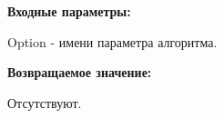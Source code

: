 \textbf{Входные параметры:}

Option - имени параметра алгоритма.

\textbf{Возвращаемое значение:}

Отсутствуют.